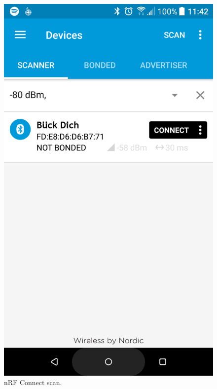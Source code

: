 \documentclass[11pt,a4paper]{article}
\begin{document}
\begin{figure}[ht]
\centering
\begin{minipage}{0.5\linewidth}
\centering
\includegraphics[width=0.9\linewidth]{example_exercise_scan.png}
\caption{nRF Connect scan.}
\label{fig::exercise_scanning}
\end{minipage}%
\begin{minipage}{0.5\linewidth}
\centering

\end{minipage}
\end{figure}
\end{document}
